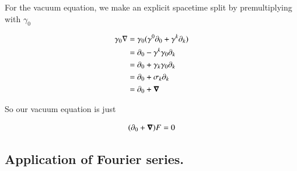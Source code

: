 \documentclass{article}
\begin{document}
For the vacuum equation, we make an explicit spacetime split by premultiplying with $\gamma_0$

\begin{align*}
\gamma_0 \nabla 
&= \gamma_0 (\gamma^0 \partial_0 + \gamma^k \partial_k) \\
&= \partial_0 - \gamma^k \gamma_0 \partial_k \\
&= \partial_0 + \gamma_k \gamma_0 \partial_k \\
&= \partial_0 + \sigma_k \partial_k \\
&= \partial_0 + \boldsymbol{\nabla} \\
\end{align*}

So our vacuum equation is just

\begin{align}
(\partial_0 + \boldsymbol{\nabla}) F = 0
\end{align}

\subsection{ Application of Fourier series. }



\end{document}

